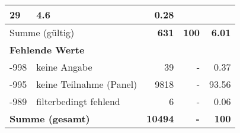\begin{longtable}{lXrrr}
       \num{29} &
       \num[round-mode=places,round-precision=2]{4,6} &
         \num[round-mode=places,round-precision=2]{0,28} \\
     \midrule
     \multicolumn{2}{l}{Summe (gültig)} &
       \textbf{\num{631}} &
     \textbf{100} &
       \textbf{\num[round-mode=places,round-precision=2]{6,01}} \\
     \multicolumn{5}{l}{\textbf{Fehlende Werte}}\\
       -998 &
       keine Angabe &
         \num{39} &
        - &
         \num[round-mode=places,round-precision=2]{0,37} \\
       -995 &
       keine Teilnahme (Panel) &
         \num{9818} &
        - &
         \num[round-mode=places,round-precision=2]{93,56} \\
       -989 &
       filterbedingt fehlend &
         \num{6} &
        - &
         \num[round-mode=places,round-precision=2]{0,06} \\
     \midrule
     \multicolumn{2}{l}{\textbf{Summe (gesamt)}} &
          \textbf{\num{10494}} &
        \textbf{-} &
        \textbf{100} \\
     \bottomrule
     \end{longtable}
     
